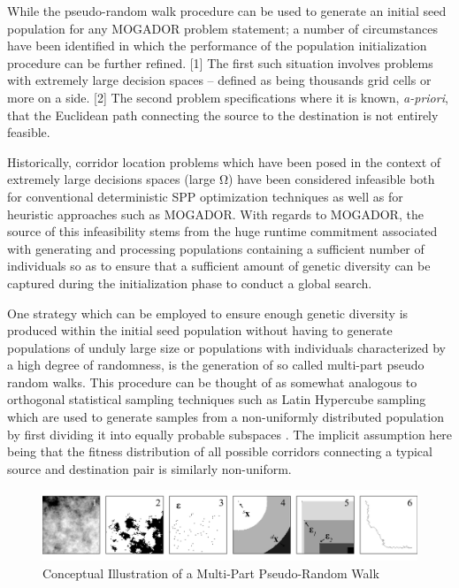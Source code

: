 While the pseudo-random walk procedure can be used to generate an initial seed population for any MOGADOR problem statement; a number of circumstances have been identified in which the performance of the population initialization procedure can be further refined. [1] The first such situation involves problems with extremely large decision spaces -- defined as being thousands grid cells or more on a side. [2] The second problem specifications where it is known, \textit{a-priori}, that the Euclidean path connecting the source to the destination is not entirely feasible.
            
Historically, corridor location problems which have been posed in the context of extremely large decisions spaces (large Ω) have been considered infeasible both for conventional deterministic SPP optimization techniques as well as for heuristic approaches such as MOGADOR. With regards to MOGADOR, the source of this infeasibility stems from the huge runtime commitment associated with generating and processing populations containing a sufficient number of individuals so as to ensure that a sufficient amount of genetic diversity can be captured during the initialization phase to conduct a global search. 

One strategy which can be employed to ensure enough genetic diversity is produced within the initial seed population without having to generate populations of unduly large size or populations with individuals characterized by a high degree of randomness, is the generation of so called multi-part pseudo random walks. This procedure can be thought of as somewhat analogous to orthogonal statistical sampling techniques such as Latin Hypercube sampling which are used to generate samples from a non-uniformly distributed population by first dividing it into equally probable subspaces \cite{McKay1979,Ye1998}. The implicit assumption here being that the fitness distribution of all possible corridors connecting a typical source and destination pair is similarly non-uniform.
            
            \begin{figure}[!h]
            \centering
            \includegraphics[width=5.5in]{figures/multi-part-pseudo-random-walk-example.png}
            \caption[Conceptual Illustration of a Multi-Part Pseudo-Random Walk]{Conceptual Illustration of a Multi-Part Pseudo-Random Walk}
            \label{fig:multi-part-pseudo-random-walk-example}
            \end{figure}
            
